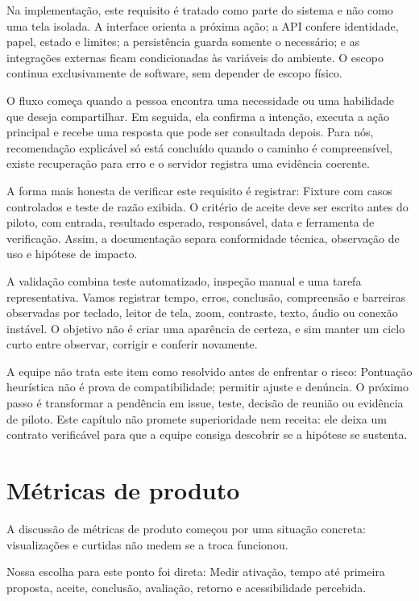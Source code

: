\documentclass[12pt,oneside,a4paper,article]{abntex2}
\begin{document}
Na implementação, este requisito é tratado como parte do sistema e não como uma tela isolada. A interface orienta a próxima ação; a API confere identidade, papel, estado e limites; a persistência guarda somente o necessário; e as integrações externas ficam condicionadas às variáveis do ambiente. O escopo continua exclusivamente de software, sem depender de escopo físico.

O fluxo começa quando a pessoa encontra uma necessidade ou uma habilidade que deseja compartilhar. Em seguida, ela confirma a intenção, executa a ação principal e recebe uma resposta que pode ser consultada depois. Para nós, recomendação explicável só está concluído quando o caminho é compreensível, existe recuperação para erro e o servidor registra uma evidência coerente.

A forma mais honesta de verificar este requisito é registrar: Fixture com casos controlados e teste de razão exibida. O critério de aceite deve ser escrito antes do piloto, com entrada, resultado esperado, responsável, data e ferramenta de verificação. Assim, a documentação separa conformidade técnica, observação de uso e hipótese de impacto.

A validação combina teste automatizado, inspeção manual e uma tarefa representativa. Vamos registrar tempo, erros, conclusão, compreensão e barreiras observadas por teclado, leitor de tela, zoom, contraste, texto, áudio ou conexão instável. O objetivo não é criar uma aparência de certeza, e sim manter um ciclo curto entre observar, corrigir e conferir novamente.

A equipe não trata este item como resolvido antes de enfrentar o risco: Pontuação heurística não é prova de compatibilidade; permitir ajuste e denúncia. O próximo passo é transformar a pendência em issue, teste, decisão de reunião ou evidência de piloto. Este capítulo não promete superioridade nem receita: ele deixa um contrato verificável para que a equipe consiga descobrir se a hipótese se sustenta.

\section{Métricas de produto}
A discussão de métricas de produto começou por uma situação concreta: visualizações e curtidas não medem se a troca funcionou.

Nossa escolha para este ponto foi direta: Medir ativação, tempo até primeira proposta, aceite, conclusão, avaliação, retorno e acessibilidade percebida.
\end{document}
